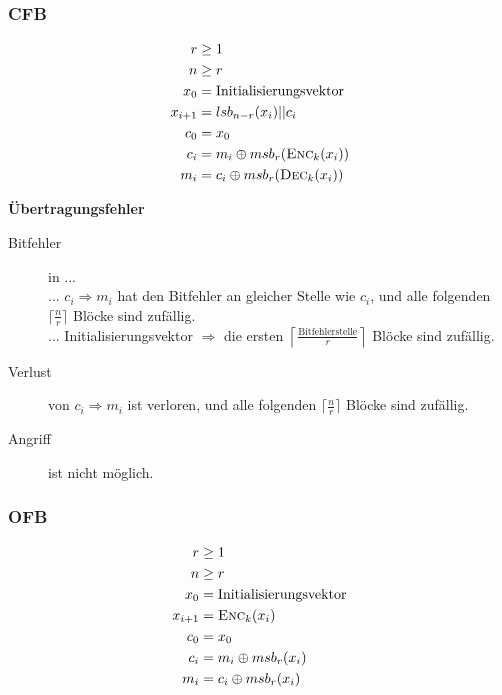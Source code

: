 \documentclass[a4paper,landscape]{article}
\newcommand{\plaint}{\ensuremath{m}}
\newcommand{\ciphert}{\ensuremath{c}}
\newcommand{\enc}{\textsc{Enc}}
\newcommand{\dec}{\textsc{Dec}}
\begin{document}
\begin{multicols*}{4}
	\subsubsection{CFB}
	\begin{align*}
		r            & \geq 1                                         \\
		n            & \geq r                                         \\
		x_{0}        & = \text{Initialisierungsvektor}                \\
		x_{i+1}      & = lsb_{n-r}(x_{i}) || \ciphert_{i}             \\
		\ciphert_{0} & = x_{0}                                        \\
		\ciphert_{i} & = \plaint_{i} \oplus msb_{r}(\enc_{k}(x_{i}))  \\
		\plaint_{i}  & = \ciphert_{i} \oplus msb_{r}(\dec_{k}(x_{i}))
	\end{align*}

	\textbf{Übertragungsfehler}
	\begin{description}
		\item[Bitfehler] in ... \\
		      ... \(\ciphert_{i} \Rightarrow \plaint_{i}\) hat den Bitfehler an gleicher
		      Stelle wie \(\ciphert_{i}\), und alle folgenden \(\lceil\frac{n}{r}\rceil\)
		      Blöcke sind zufällig. \\
		      ... Initialisierungsvektor \(\Rightarrow\) die ersten
		      \(\left\lceil\frac{\text{Bitfehlerstelle}}{r}\right\rceil\) Blöcke sind
		      zufällig.
		\item[Verlust] von \(\ciphert_{i} \Rightarrow \plaint_{i}\) ist verloren,
		      und alle folgenden \(\lceil\frac{n}{r}\rceil\) Blöcke sind zufällig.
		\item[Angriff] ist nicht möglich.
	\end{description}

	\subsubsection{OFB}
	\begin{align*}
		r            & \geq 1                               \\
		n            & \geq r                               \\
		x_{0}        & = \text{Initialisierungsvektor}      \\
		x_{i+1}      & = \enc_{k}(x_{i})                    \\
		\ciphert_{0} & = x_{0}                              \\
		\ciphert_{i} & = \plaint_{i} \oplus msb_{r}(x_{i})  \\
		\plaint_{i}  & = \ciphert_{i} \oplus msb_{r}(x_{i})
	\end{align*}


\end{multicols*}
\end{document}
